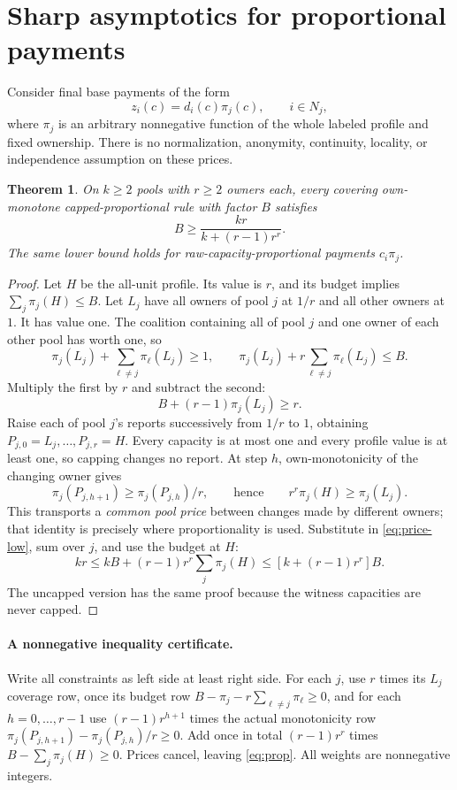 \documentclass[11pt]{article}
\newtheorem{theorem}{Theorem}[section]
\theoremstyle{definition}\newtheorem{definition}[theorem]{Definition}
\theoremstyle{remark}\newtheorem{remark}[theorem]{Remark}
\begin{document}
\section{Sharp asymptotics for proportional payments}\label{sec:prop}
Consider final base payments of the form
\[
 z_i(c)=d_i(c)\pi_j(c),\qquad i\in N_j,
\]
where $\pi_j$ is an arbitrary nonnegative function of the whole labeled
profile and fixed ownership. There is no normalization, anonymity,
continuity, locality, or independence assumption on these prices.

\begin{theorem}\label{thm:prop}
On $k\ge2$ pools with $r\ge2$ owners each, every covering own-monotone
capped-proportional rule with factor $B$ satisfies
\begin{equation}\label{eq:prop}
 B\ge\frac{kr}{k+(r-1)r^r}.
\end{equation}
The same lower bound holds for raw-capacity-proportional payments $c_i\pi_j$.
\end{theorem}
\begin{proof}
Let $H$ be the all-unit profile. Its value is $r$, and its budget implies
$\sum_j\pi_j(H)\le B$. Let $L_j$ have all owners of pool $j$ at $1/r$
and all other owners at $1$. It has value one. The coalition containing all
of pool $j$ and one owner of each other pool has worth one, so
\[
 \pi_j(L_j)+\sum_{\ell\ne j}\pi_\ell(L_j)\ge1,
 \qquad \pi_j(L_j)+r\sum_{\ell\ne j}\pi_\ell(L_j)\le B.
\]
Multiply the first by $r$ and subtract the second:
\begin{equation}\label{eq:price-low}
 B+(r-1)\pi_j(L_j)\ge r.
\end{equation}
Raise each of pool $j$'s reports successively from $1/r$ to $1$, obtaining
$P_{j,0}=L_j,\ldots,P_{j,r}=H$. Every capacity is at most one and every
profile value is at least one, so capping changes no report. At step $h$,
own-monotonicity of the changing owner gives
\[
 \pi_j(P_{j,h+1})\ge\pi_j(P_{j,h})/r,
 \qquad\text{hence}\qquad r^r\pi_j(H)\ge\pi_j(L_j).
\]
This transports a \emph{common pool price} between changes made by different
owners; that identity is precisely where proportionality is used. Substitute
in \eqref{eq:price-low}, sum over $j$, and use the budget at $H$:
\[
 kr\le kB+(r-1)r^r\sum_j\pi_j(H)
 \le[k+(r-1)r^r]B.
\]
The uncapped version has the same proof because the witness capacities are
never capped.
\end{proof}

\paragraph{A nonnegative inequality certificate.}
Write all constraints as left side at least right side. For each $j$, use
$r$ times its $L_j$ coverage row, once its budget row
$B-\pi_j-r\sum_{\ell\ne j}\pi_\ell\ge0$, and for each $h=0,\ldots,r-1$
use $(r-1)r^{h+1}$ times the actual monotonicity row
$\pi_j(P_{j,h+1})-\pi_j(P_{j,h})/r\ge0$. Add once in total
$(r-1)r^r$ times $B-\sum_j\pi_j(H)\ge0$. Prices cancel, leaving
\eqref{eq:prop}. All weights are nonnegative integers.
\end{document}
